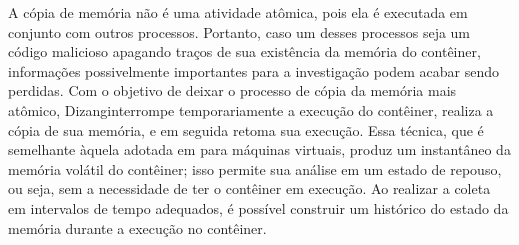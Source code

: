 \documentclass[conference]{IEEEtran}
\newcommand{\marcosT}[1]{{\color{red}{TODO: #1}}}
\newcommand{\fancyname}{Dizang}
\begin{document}
A cópia de memória não é uma atividade atômica, pois ela é executada em conjunto com outros processos. 
%
Portanto, caso um desses processos seja um código malicioso apagando traços de sua existência da memória do contêiner, informações possivelmente importantes para a investigação podem acabar sendo perdidas. 
%
Com o objetivo de deixar o processo de cópia da memória mais atômico, \fancyname interrompe temporariamente a execução do contêiner, realiza a cópia de sua memória, e em seguida retoma sua execução. 
%
Essa técnica, que é semelhante àquela adotada em \cite{Rafique_Static_Live_Digital_Forensics:2013} para máquinas virtuais, produz um instantâneo da memória volátil do contêiner; isso permite sua análise em um estado de repouso, ou seja, sem a necessidade de ter o contêiner em execução.
%
Ao realizar a coleta em intervalos de tempo adequados, é possível construir um histórico do estado da memória durante a execução no contêiner.
%
\end{document}

